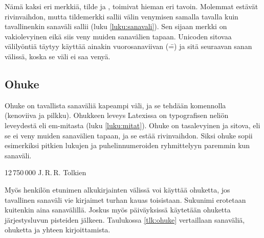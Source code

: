 Nämä kaksi eri merkkiä, tilde ja , toimivat hieman eri
tavoin. Molemmat estävät rivinvaihdon, mutta tildemerkki sallii välin
venymisen samalla tavalla kuin tavallinenkin sanaväli sallii (luku
\ref{luku:sanavali}). Sen sijaan merkki  on
vakiolevyinen eikä siis veny muiden sanavälien tapaan. Unicoden sitovaa
välilyöntiä  täytyy käyttää ainakin vuorosanaviivan
(\==) ja sitä seuraavan sanan välissä, koska se väli ei saa venyä.

\subsection{Ohuke}
\label{luku:ohuke}

Ohuke on tavallista sanaväliä kapeampi väli, ja se tehdään
komennolla~\koodi{\keno,} (kenoviiva ja pilkku). Ohukkeen leveys
Latexissa on  typografisen neliön leveydestä eli
em-mitasta (luku \ref{luku:mitat}). Ohuke on tasalevyinen ja sitova, eli
se ei veny muiden sanavälien tapaan, ja se estää rivinvaihdon. Siksi
ohuke sopii esimerkiksi pitkien lukujen ja puhelinnumeroiden
ryhmittelyyn paremmin kun sanaväli.

\begin{koodilohkosis}
  12\,750\,000
  J.\,R.\,R. Tolkien
\end{koodilohkosis}

Myös henkilön etunimen alkukirjainten välissä voi käyttää ohuketta, jos
tavallinen sanaväli vie kirjaimet turhan kauas toisistaan. Sukunimi
erotetaan kuitenkin aina sanavälillä. Joskus myös päiväyksissä käytetään
ohuketta järjestysluvun pisteiden jälkeen. Taulukossa \ref{tlk:ohuke}
vertaillaan sanaväliä, ohuketta ja yhteen kirjoittamista.


